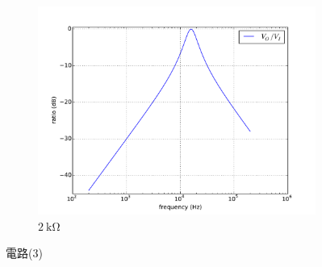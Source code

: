 \documentclass[12pt, a4paper]{article}
\begin{document}
\begin{enumerate}[itemsep=20pt, topsep=10pt]
\begin{enumerate}[label=(\alph*)]
\begin{figure}[H]
\begin{subfigure}[b]{0.45\textwidth}
          \includegraphics[width=1\textwidth]{circuit/p33.pdf}
          \caption{$\SI{2}\kohm$}
        \end{subfigure}
        \caption{電路(3)}
      \end{figure}
    \end{enumerate}

\end{enumerate}
\end{document}
